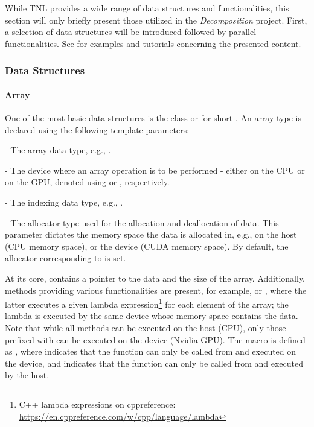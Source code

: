 While TNL provides a wide range of data structures and functionalities, this section will only briefly present those utilized in the \textit{Decomposition} project.
First, a selection of data structures will be introduced followed by parallel functionalities.
See  \cite{ixA8ZYptYohwlgwt} for examples and tutorials concerning the presented content.

\subsubsection{Data Structures}

\paragraph{Array} One of the most basic data structures is the  class or  for short \cite{ixA8ZYptYohwlgwt}.
An array type is declared using the following template parameters:

\begin{tight_itemize}
	\item {} - The array data type, e.g., .
	\item {} - The device where an array operation is to be performed - either on the CPU or on the GPU, denoted using  or , respectively.
	\item {} - The indexing data type, e.g., .
	\item {} - The allocator type used for the allocation and deallocation of data.
This parameter dictates the memory space the data is allocated in, e.g., on the host (CPU memory space), or the device (CUDA memory space).
By default, the allocator corresponding to  is set.
\end{tight_itemize}

At its core,  contains a pointer to the data and the size of the array.
Additionally, methods providing various functionalities are present, for example,  or , where the latter executes a given lambda expression\footnote{C++ lambda expressions on cppreference: \url{https://en.cppreference.com/w/cpp/language/lambda}} for each element of the array; the lambda is executed by the same device whose memory space contains the data.
Note that while all methods can be executed on the host (CPU), only those prefixed with  can be executed on the device (Nvidia GPU).
The  macro is defined as , where  indicates that the function can only be called from and executed on the device, and  indicates that the function can only be called from and executed by the host.

